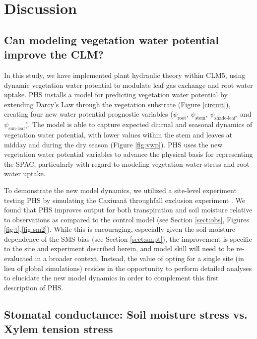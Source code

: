 \documentclass[draft,linenumbers]{agujournal}
\begin{document}
\section{Discussion}
\subsection{Can modeling vegetation water potential improve the CLM?}

    In this study, we have implemented plant hydraulic theory within CLM5, 
    using dynamic vegetation water potential to modulate leaf gas exchange and root water uptake.
    PHS installs a model for predicting vegetation water potential by extending Darcy's Law through the vegetation substrate (Figure \ref{circuit}), 
    creating four new water potential prognostic variables ($\psi_{\text{root}}$, $\psi_{\text{stem}}$, $\psi_{\text{shade-leaf}}$, and $\psi_{\text{sun-leaf}}$).  
    The model is able to capture expected diurnal and seasonal dynamics of vegetation water potential, 
    with lower values within the stem and leaves at midday and during the dry season (Figure \ref{fig:vwp}).
    PHS uses the new vegetation water potential variables to advance the physical basis for representing the SPAC, particularly with regard to modeling vegetation water stress and root water uptake.
    
    To demonstrate the new model dynamics, we utilized a site-level experiment testing PHS by simulating the Caxiuan\~a throughfall exclusion experiment \citep{fisher2007}.
    We found that PHS improves output for both transpiration and soil moisture relative to observations as compared to the control model (see Section \ref{sect:obs}, Figures \ref{fig:t},\ref{fig:sm2}).
    While this is encouraging, especially given the soil moisture dependence of the SMS bias (see Section \ref{sect:smpt}), the improvement is specific to the site and experiment described herein, and model skill will need to be re-evaluated in a broader context.
    Instead, the value of opting for a single site (in lieu of global simulations) resides in the opportunity to perform detailed analyses to elucidate the new model dynamics in order to complement this first description of PHS.
    

\subsection{Stomatal conductance: Soil moisture stress vs. Xylem tension stress}
    \label{sect:stress}
    
\end{document}
